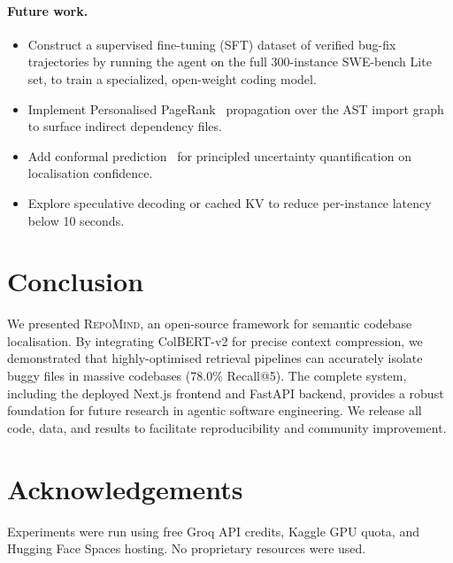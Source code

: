 \documentclass[11pt]{article}
\begin{document}
\paragraph{Future work.}
\begin{itemize}
  \item Construct a supervised fine-tuning (SFT) dataset of verified bug-fix 
        trajectories by running the agent on the full 300-instance SWE-bench 
        Lite set, to train a specialized, open-weight coding model.
  \item Implement Personalised PageRank~\cite{page1999pagerank} propagation
        over the AST import graph to surface indirect dependency files.
  \item Add conformal prediction~\cite{angelopoulos2023gentle} for principled
        uncertainty quantification on localisation confidence.
  \item Explore speculative decoding or cached KV to reduce per-instance 
        latency below 10 seconds.
\end{itemize}

\section{Conclusion}

We presented \textsc{RepoMind}, an open-source framework for semantic codebase 
localisation. By integrating ColBERT-v2 for precise context compression, we 
demonstrated that highly-optimised retrieval pipelines can accurately isolate 
buggy files in massive codebases (78.0\% Recall@5). The complete system,
including the deployed Next.js frontend and FastAPI backend, provides a
robust foundation for future research in agentic software engineering.
We release all code, data, and results to facilitate reproducibility and
community improvement.

\section*{Acknowledgements}
Experiments were run using free Groq API credits, Kaggle GPU quota, and
Hugging Face Spaces hosting. No proprietary resources were used.



\end{document}
